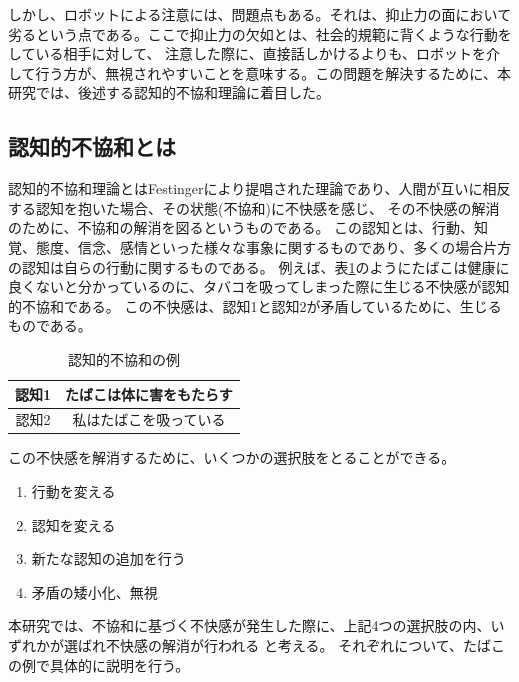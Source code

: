 \documentclass[11pt,a4j]{jreport}
\begin{document}
しかし、ロボットによる注意には、問題点もある。それは、抑止力の面において劣るという点である\cite{Mizumaru2019}。ここで抑止力の欠如とは、社会的規範に背くような行動をしている相手に対して、
注意した際に、直接話しかけるよりも、ロボットを介して行う方が、無視されやすいことを意味する。この問題を解決するために、本研究では、後述する認知的不協和理論に着目した。

\subsection{認知的不協和とは} %
\label{sec: CDT}
認知的不協和理論\cite{Festinger1957}とはFestingerにより提唱された理論であり、人間が互いに相反する認知を抱いた場合、その状態(不協和)に不快感を感じ、
その不快感の解消のために、不協和の解消を図るというものである。
この認知とは、行動、知覚、態度、信念、感情といった様々な事象に関するものであり、多くの場合片方の認知は自らの行動に関するものである。
例えば、表\ref{fig: CDTExample}のようにたばこは健康に良くないと分かっているのに、タバコを吸ってしまった際に生じる不快感が認知的不協和である。
この不快感は、認知1と認知2が矛盾しているために、生じるものである。
\begin{table}[H]
  \centering
  
  \label{fig: CDTExample}
  \begin{tabular}{c|c}

      認知1 & たばこは体に害をもたらす  \\ \hline
      認知2 & 私はたばこを吸っている \\ 
  \end{tabular}
  \caption{認知的不協和の例}
\end{table}


この不快感を解消するために、いくつかの選択肢をとることができる。
\begin{enumerate}
  \item 行動を変える
  \item 認知を変える
  \item 新たな認知の追加を行う
  \item 矛盾の矮小化、無視
\end{enumerate}
本研究では、不協和に基づく不快感が発生した際に、上記4つの選択肢の内、いずれかが選ばれ不快感の解消が行われる
と考える。
それぞれについて、たばこの例で具体的に説明を行う。
\end{document}
